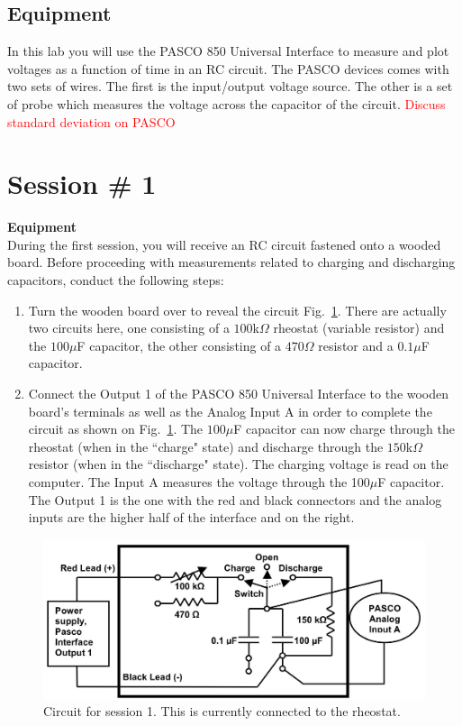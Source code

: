 \documentclass[12pt]{report}
\def \todo #1{\textcolor{red}{#1}}
\begin{document}
\subsection{Equipment}
In this lab you will use the PASCO 850 Universal Interface to measure and plot voltages as a function of time in an RC circuit. The PASCO devices comes with two sets of wires. The first is the input/output voltage source. The other is a set of probe which measures the voltage across the capacitor of the circuit. \todo{Discuss standard deviation on PASCO}

\section{Session \# 1}
\noindent \large \textbf{Equipment} \normalsize \\
During the first session, you will receive an RC circuit fastened onto a wooded board. Before proceeding with measurements related to charging and discharging capacitors, conduct the following steps:
\begin{enumerate}
\item Turn the wooden board over to reveal the circuit Fig.~\ref{Fig:lab2-session1-circuit1}. There are actually two circuits here, one consisting of a $100$k$\Omega$ rheostat (variable resistor) and the $100\mu$F capacitor, the other consisting of a $470\Omega$ resistor and a $0.1\mu$F capacitor.
\item Connect the Output 1 of the PASCO 850 Universal Interface to the wooden board's terminals as well as the Analog Input A in order to complete the circuit as shown on Fig.~\ref{Fig:lab2-session1-circuit1}. The $100\mu$F capacitor can now charge through the rheostat (when in the ``charge" state) and discharge through the $150$k$\Omega$ resistor (when in the ``discharge" state). The charging voltage is read on the computer. The Input A measures the voltage through the 100$\mu$F capacitor. The Output 1 is the one with the red and black connectors and the analog inputs are the higher half of the interface and on the right.
\end{enumerate}

\begin{figure}[h]
\centering
\includegraphics[width=0.75\linewidth]{lab2-session1-circuit1}
\caption{Circuit for session 1. This is currently connected to the rheostat.}
\label{Fig:lab2-session1-circuit1}
\end{figure}
\end{document}
